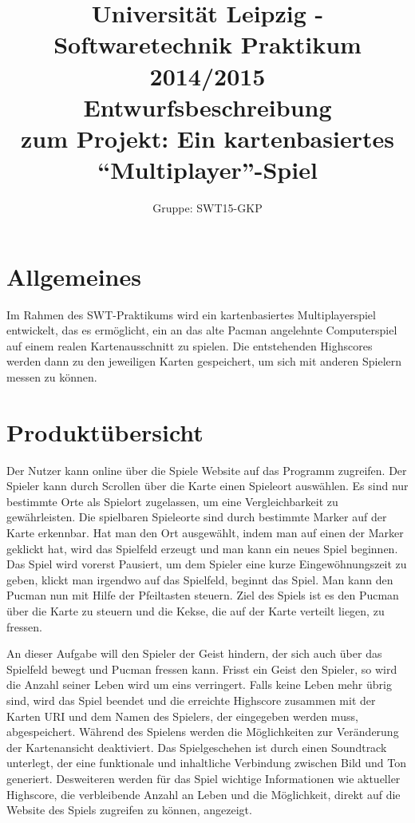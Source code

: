 \documentclass[11pt,a4paper]{article}
\author{Gruppe: SWT15-GKP}
\title{Universität Leipzig - Softwaretechnik Praktikum 2014/2015 \\  Entwurfsbeschreibung \\ zum Projekt: Ein kartenbasiertes “Multiplayer”-Spiel}
\begin{document}
\maketitle


\tableofcontents

\clearpage

\section{Allgemeines}
Im Rahmen des SWT-Praktikums wird ein kartenbasiertes Multiplayerspiel entwickelt, das es ermöglicht, ein an das alte Pacman angelehnte Computerspiel auf einem realen Kartenausschnitt zu spielen. Die entstehenden Highscores werden dann zu den jeweiligen Karten gespeichert, um sich mit anderen Spielern messen zu können.


\section{Produktübersicht}
Der Nutzer kann online über die Spiele Website auf das Programm zugreifen.
Der Spieler kann durch Scrollen über die Karte einen Spieleort auswählen. Es sind nur bestimmte Orte als Spielort zugelassen, um eine Vergleichbarkeit zu gewährleisten.
Die spielbaren Spieleorte sind durch bestimmte Marker auf der Karte erkennbar.
Hat man den Ort ausgewählt, indem man auf einen der Marker geklickt hat, wird das Spielfeld erzeugt und man kann ein neues Spiel beginnen. 
Das Spiel wird vorerst Pausiert, um dem Spieler eine kurze Eingewöhnungszeit zu geben, klickt man irgendwo auf das Spielfeld, beginnt das Spiel.
Man kann den Pucman nun mit Hilfe der Pfeiltasten steuern.
Ziel des Spiels ist es den Pucman über die Karte zu steuern und die Kekse, die auf der Karte verteilt liegen, zu fressen. 

An dieser Aufgabe will den Spieler der Geist hindern, der sich auch über das Spielfeld bewegt und Pucman fressen kann. Frisst ein Geist den Spieler, so wird %
die Anzahl seiner Leben wird um eins verringert.
Falls keine Leben mehr übrig sind, wird das Spiel beendet und die erreichte Highscore zusammen mit der Karten URI und dem Namen des Spielers, der eingegeben werden muss, abgespeichert.
Während des Spielens werden die Möglichkeiten zur Veränderung der Kartenansicht deaktiviert. 
Das Spielgeschehen ist durch einen Soundtrack unterlegt, der eine funktionale und inhaltliche Verbindung zwischen Bild und Ton generiert.
Desweiteren werden für das Spiel wichtige Informationen wie aktueller Highscore, die verbleibende Anzahl an Leben und die Möglichkeit, direkt auf die Website des Spiels zugreifen zu können, angezeigt.
\clearpage
\end{document}

